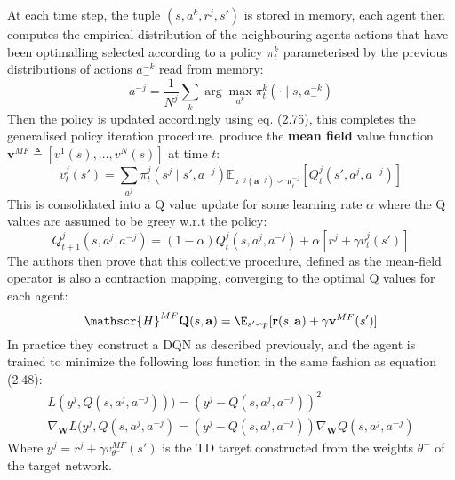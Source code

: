 At each time step, the tuple $(s, {a^k}, {r^j}, s')$ is stored in memory,
each agent then computes the empirical distribution of the neighbouring
agents actions that have been optimalling selected according to a policy 
$\pi^k_t$ parameterised by the previous distributions of actions $a^{-k}_-$ read from memory:
\begin{equation}
    a^{-j} = \frac{1}{N^j} \sum_k \arg \max_{a^k} \pi^k_t(\cdot \mid s, a^{-k}_-)
\end{equation}
Then the policy is updated accordingly using eq. (2.75), this completes the generalised
policy iteration procedure. \cite{Yang2018} produce the \textbf{mean field} value function 
$\mathbf{v}^{MF} \triangleq [v^1(s),\hdots, v^N(s)]$ at time $t$:
\begin{equation}
    v^j_t(s')= \sum_{a^j}\pi^j_t(s^j \mid s', a^{-j}) \mathbb{E}_{a^{-j}(\mathbf{a}^{-j}) \backsim \boldsymbol \pi_t^{-j}}[Q^j_t(s',a^j,a^{-j})]
\end{equation}
This is consolidated into a Q value update for some learning rate $\alpha$ where the Q values are
assumed to be greey w.r.t the policy:
\begin{equation}
    Q^j_{t+1}(s,a^j,a^{-j})= (1-\alpha)Q^j_t(s,a^j,a^{-j}) +\alpha[r^j+ \gamma v^j_t(s')]
\end{equation}
The authors then prove that this collective procedure, defined as the mean-field operator
is also a contraction mapping, converging to the optimal Q values for each agent:
\begin{equation}
    \mathscr{H}^{MF} \mathbf{Q}(s, \mathbf{a}) = \E_{s'\backsim p}[\mathbf{r}(s,\mathbf{a}) +\gamma \mathbf{v}^{MF}(s')]
\end{equation}
In practice they construct a DQN as described previously, and the agent is trained to
minimize the following loss function in the same fashion as equation (2.48):
\begin{equation}
    \begin{gathered}
        L(y^j, Q(s, a^j, a^{-j}))) = (y^j - Q(s, a^j, a^{-j}))^2 \\
        \nabla_{\mathbf{W}} L(y^j, Q(s, a^j, a^{-j}) = (y^j - Q(s, a^j, a^{-j})) \nabla_{\mathbf{W}} Q(s, a^j, a^{-j})
    \end{gathered}
\end{equation}
Where $y^j = r^j + \gamma v^{MF}_{\theta^-}(s')$ is the TD target constructed from the weights $\theta^-$ of the target network.

